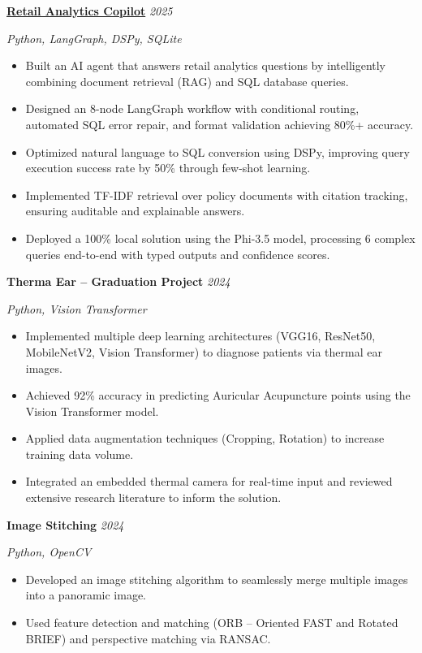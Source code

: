 \documentclass[a4paper,11pt]{article}
\newcommand{\cvproject}[2]{%
  \textbf{#1} \hfill \textit{#2}
  \vspace{2pt}
}
\begin{document}
\cvproject{\href{https://github.com/Khaled100233/retail-analytics-copilot}{Retail Analytics Copilot}}{2025}
\newline \textit{Python, LangGraph, DSPy, SQLite}
\begin{itemize}[leftmargin=1.5em, topsep=2pt, itemsep=-5pt]
  \item Built an AI agent that answers retail analytics questions by intelligently combining document retrieval (RAG) and SQL database queries.
  \item Designed an 8-node LangGraph workflow with conditional routing, automated SQL error repair, and format validation achieving 80\%+ accuracy.
  \item Optimized natural language to SQL conversion using DSPy, improving query execution success rate by 50\% through few-shot learning.
  \item Implemented TF-IDF retrieval over policy documents with citation tracking, ensuring auditable and explainable answers.
  \item Deployed a 100\% local solution using the Phi-3.5 model, processing 6 complex queries end-to-end with typed outputs and confidence scores.
\end{itemize}

\vspace{6pt}

\cvproject{Therma Ear -- Graduation Project}{2024}
\newline \textit{Python, Vision Transformer}
\begin{itemize}[leftmargin=1.5em, topsep=2pt, itemsep=-5pt]
  \item Implemented multiple deep learning architectures (VGG16, ResNet50, MobileNetV2, Vision Transformer) to diagnose patients via thermal ear images.
  \item Achieved 92\% accuracy in predicting Auricular Acupuncture points using the Vision Transformer model.
  \item Applied data augmentation techniques (Cropping, Rotation) to increase training data volume.
  \item Integrated an embedded thermal camera for real-time input and reviewed extensive research literature to inform the solution.
\end{itemize}

\vspace{6pt}

\cvproject{Image Stitching}{2024}
\newline \textit{Python, OpenCV}
\begin{itemize}[leftmargin=1.5em, topsep=2pt, itemsep=-5pt]
  \item Developed an image stitching algorithm to seamlessly merge multiple images into a panoramic image.
  \item Used feature detection and matching (ORB -- Oriented FAST and Rotated BRIEF) and perspective matching via RANSAC.
\end{itemize}
\end{document}

